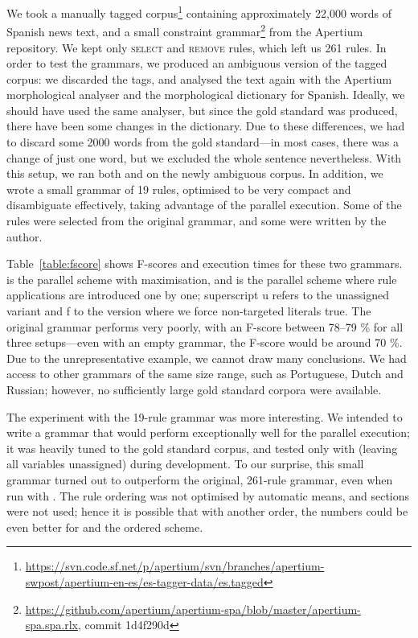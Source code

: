 We took a manually tagged
corpus\footnote{\url{https://svn.code.sf.net/p/apertium/svn/branches/apertium-swpost/apertium-en-es/es-tagger-data/es.tagged}}
containing approximately 22,000 words of Spanish news text, and a
small constraint
grammar\footnote{\url{https://github.com/apertium/apertium-spa/blob/master/apertium-spa.spa.rlx}, commit 1d4f290d} from the Apertium repository.  We kept only
\textsc{select} and \textsc{remove} rules, which left us 261 rules.
In order to test the grammars, we produced an ambiguous version of the
tagged corpus: we discarded the tags, and analysed the text again with
the Apertium morphological analyser and the morphological dictionary
for Spanish. Ideally, we should have used the same analyser, but since
the gold standard was produced, there have been some changes in the
dictionary. Due to these differences, we had to discard some 2000
words from the gold standard---in most cases, there was a change of
just one word, but we excluded the whole sentence nevertheless.  With
this setup, we ran both \satcg{} and  on the newly ambiguous
corpus.  In addition, we wrote a small grammar of 19 rules, optimised
to be very compact and disambiguate effectively, taking advantage of
the parallel execution.  Some of the rules were selected from the
original grammar, and some were written by the author.


Table~\ref{table:fscore} shows F-scores and execution times for these two grammars.
\satcgMax{} is the parallel scheme with maximisation, and
\satcgOrd{} is the parallel scheme where rule applications are introduced one by one; superscript {\sc u} refers to the unassigned variant and {\sc f} to the version where we force non-targeted literals true.
The original grammar performs very poorly, with an F-score between 78--79 \% for all three setups---even with an empty grammar, the F-score would be around 70 \%.
Due to the unrepresentative example, we cannot draw many conclusions.
We had access to other grammars of the same size range, such as
Portuguese, Dutch and Russian;
however, no sufficiently large gold standard corpora were available.

The experiment with the 19-rule grammar was more interesting.
We intended to write a grammar that would perform exceptionally well for the parallel
execution; it was heavily tuned to the gold standard corpus,
and tested only with \satcg{} (leaving all variables unassigned) during development.
To our surprise, this small grammar turned out to outperform the original,
261-rule grammar, even when run with .
The rule ordering was not optimised by automatic means, and sections were not used; hence it is possible that with another order, the numbers could be even better for  and the ordered scheme.


